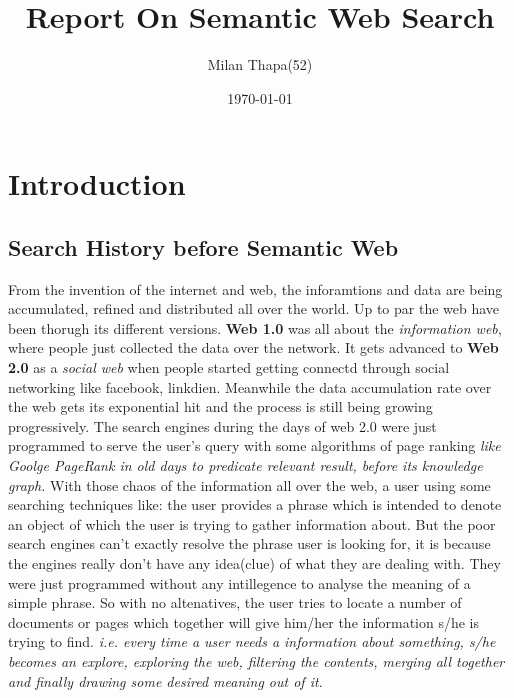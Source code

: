 \documentclass[12pt,a4]{article}
\title{Report On Semantic Web Search}
\author{Milan Thapa(52)}
\date{\today}
\begin{document}

\clearpage

\setcounter{page}{2}
\tableofcontents
\newpage
\section{Introduction}

\subsection{Search History before Semantic Web}
From the invention of the internet and web, the inforamtions and data are being accumulated, refined and distributed all over the world. Up to par the web have been thorugh its different versions. \textbf{ Web 1.0} was all about the \textit{information web}, where people just collected the data over the network. It gets advanced to \textbf{Web 2.0} as a \textit{social web} when people started getting connectd through social networking like facebook, linkdien. Meanwhile the data accumulation rate over the web gets its exponential hit and the process is still being growing progressively. The search engines during the days of web 2.0  were just programmed to serve the user's query with some algorithms of page ranking \textit{like Goolge PageRank in old days to predicate relevant result, before its knowledge graph.} With those chaos of the information all over the web, a user using some searching techniques like: the user provides a phrase which is intended to denote an object of which the user is trying to gather information about. But the poor search engines can't exactly resolve the phrase user is looking for, it is because the engines really don't have any idea(clue) of what they are dealing with. They were just programmed without any intillegence to analyse the meaning of a simple phrase. So with no altenatives, the user tries to locate a number of documents or pages which together will give him/her the information s/he is trying to find. \textit{i.e. every time a user needs a information about something, s/he becomes an explore, exploring the web, filtering the contents, merging all together and finally drawing some desired meaning out of it.}
\end{document}
